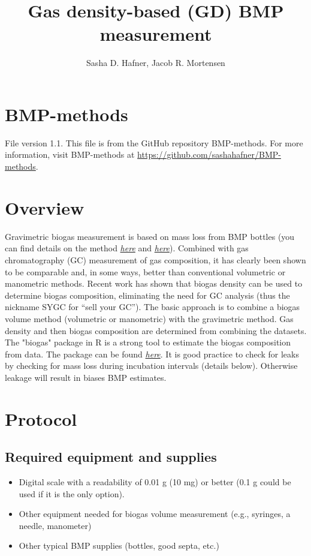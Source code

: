 \documentclass[]{article}
\title {Gas density-based (GD) BMP measurement}
\author{Sasha D. Hafner, Jacob R. Mortensen\\
}
\begin{document}
\maketitle

\section{BMP-methods}
File version 1.1. 
This file is from the GitHub repository BMP-methods.
For more information, visit BMP-methods at \url{https://github.com/sashahafner/BMP-methods}.

\section{Overview}

Gravimetric biogas measurement is based on mass loss from BMP bottles (you can find details on the method \href{https://www.sciencedirect.com/science/article/pii/S0961953415301148}{\textit{here}} and \href{https://iwaponline.com/wpt/article-abstract/13/1/52/38679/Quantification-of-leakage-in-batch-biogas-assays?redirectedFrom=PDF}{\textit{here}}). Combined with gas chromatography (GC) measurement of gas composition, it has clearly been shown to be comparable and, in some ways, better than conventional volumetric or manometric methods. Recent work has shown that biogas density can be used to determine biogas composition, eliminating the need for GC analysis (thus the nickname SYGC for “sell your GC”). The basic approach is to combine a biogas volume method (volumetric or manometric) with the gravimetric method. Gas density and then biogas composition are determined from combining the datasets. The "biogas" package in R is a strong tool to estimate the biogas composition from data. The package can be found \href{https://cran.r-project.org/web/packages/biogas/index.html}{\textit{here}}. It is good practice to check for leaks by checking for mass loss during incubation intervals (details below). Otherwise leakage will result in biases BMP estimates.

\section{Protocol}

\subsection{Required equipment and supplies}

\begin{itemize}
    \item Digital scale with a readability of 0.01 g (10 mg) or better (0.1 g could be used if it is the only option).
    \item Other equipment needed for biogas volume measurement (e.g., syringes, a needle, manometer)
    \item Other typical BMP supplies (bottles, good septa, etc.)
\end{itemize}
\newline
\end{document}
